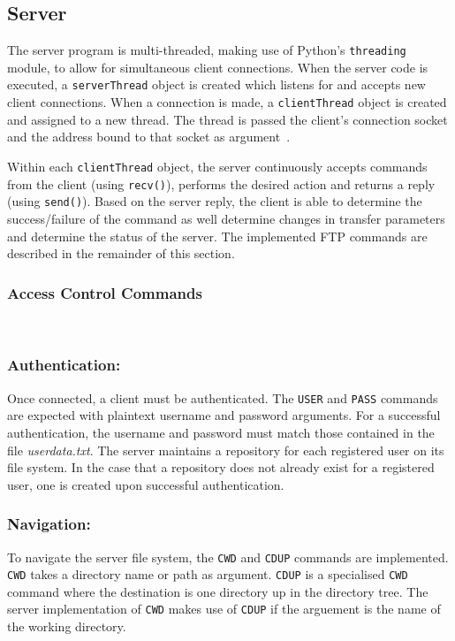 \documentclass[10pt,twocolumn]{witseiepaper}
\begin{document}
\vspace*{-2mm}
\subsection{Server}

 The server program is multi-threaded, making use of Python's \texttt{threading} module, to allow for simultaneous client connections. When the server code is executed, a \texttt{serverThread} object is created which listens for and accepts new client connections. When a connection is made, a \texttt{clientThread} object is created and assigned to a new thread. The thread is passed the client's connection socket and the address bound to that socket as argument~\cite{socketModule}.
 
 Within each \texttt{clientThread} object, the server continuously accepts commands from the client (using \texttt{recv()}), performs the desired action and returns a reply (using \texttt{send()}). Based on the server reply, the client is able to determine the success/failure of the command as well determine changes in transfer parameters and determine the status of the server. The implemented FTP commands are described in the remainder of this section.
 
\vspace*{-2mm}
\subsubsection{Access Control Commands} $   $

\subsubsection*{Authentication:} \vspace*{-\baselineskip}
Once connected, a client must be authenticated. The \texttt{USER} and \texttt{PASS} commands are expected with plaintext username and password arguments. For a successful authentication, the username and password must match those contained in the file \textit{userdata.txt}. The server maintains a repository for each registered user on its file system. In the case that a repository does not already exist for a registered user, one is created upon successful authentication.

\vspace*{-2mm}
\subsubsection*{Navigation:}
To navigate the server file system, the \texttt{CWD} and \texttt{CDUP} commands are implemented. \texttt{CWD} takes a directory name or path as argument. \texttt{CDUP} is a specialised \texttt{CWD} command where the destination is one directory up in the directory tree. The server implementation of \texttt{CWD} makes use of \texttt{CDUP} if the arguement is the name of the working directory.
\end{document}
